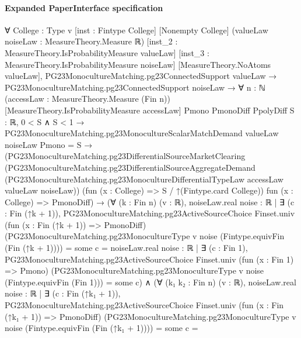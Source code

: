 \documentclass[10pt]{article}
\begin{document}
\paragraph{Expanded PaperInterface specification}
\begin{ReviewVerbatim}
∀ {College : Type v} [inst : Fintype College] [Nonempty College] (valueLaw noiseLaw : MeasureTheory.Measure ℝ)
  [inst_2 : MeasureTheory.IsProbabilityMeasure valueLaw] [inst_3 : MeasureTheory.IsProbabilityMeasure noiseLaw]
  [MeasureTheory.NoAtoms valueLaw],
  PG23MonocultureMatching.pg23ConnectedSupport valueLaw →
    PG23MonocultureMatching.pg23ConnectedSupport noiseLaw →
      ∀ {n : ℕ} (accessLaw : MeasureTheory.Measure (Fin n)) [MeasureTheory.IsProbabilityMeasure accessLaw]
        {Pmono PmonoDiff PpolyDiff S : ℝ},
        0 < S ∧ S < 1 →
          PG23MonocultureMatching.pg23MonocultureScalarMatchDemand valueLaw noiseLaw Pmono = S →
            (PG23MonocultureMatching.pg23DifferentialSourceMarketClearing
                (PG23MonocultureMatching.pg23DifferentialSourceAggregateDemand
                  (PG23MonocultureMatching.pg23MonocultureDifferentialTypeLaw accessLaw valueLaw noiseLaw))
                (fun (x : College) => S / ↑(Fintype.card College)) fun (x : College) => PmonoDiff) →
              (∀ (k : Fin n) (v : ℝ),
                  noiseLaw.real
                      {noise : ℝ |
                        ∃ (c : Fin (↑k + 1)),
                          PG23MonocultureMatching.pg23ActiveSourceChoice Finset.univ
                              (fun (x : Fin (↑k + 1)) => PmonoDiff)
                              (PG23MonocultureMatching.pg23MonocultureType v noise (Fintype.equivFin (Fin (↑k + 1)))) =
                            some c} =
                    noiseLaw.real
                      {noise : ℝ |
                        ∃ (c : Fin 1),
                          PG23MonocultureMatching.pg23ActiveSourceChoice Finset.univ (fun (x : Fin 1) => Pmono)
                              (PG23MonocultureMatching.pg23MonocultureType v noise (Fintype.equivFin (Fin 1))) =
                            some c}) ∧
                (∀ (k₁ k₂ : Fin n) (v : ℝ),
                    noiseLaw.real
                        {noise : ℝ |
                          ∃ (c : Fin (↑k₁ + 1)),
                            PG23MonocultureMatching.pg23ActiveSourceChoice Finset.univ
                                (fun (x : Fin (↑k₁ + 1)) => PmonoDiff)
                                (PG23MonocultureMatching.pg23MonocultureType v noise
                                  (Fintype.equivFin (Fin (↑k₁ + 1)))) =
                              some c} =

\end{ReviewVerbatim}
\end{document}
